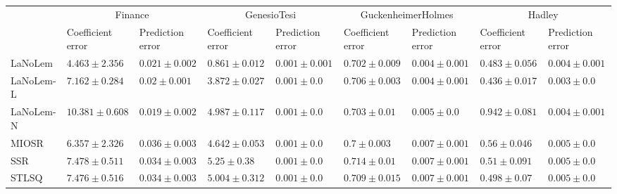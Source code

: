 \begin{table*}
{\begin{tabular}{lllllllll}
 & \multicolumn{2}{c}{Finance} & \multicolumn{2}{c}{GenesioTesi} & \multicolumn{2}{c}{GuckenheimerHolmes} & \multicolumn{2}{c}{Hadley} \\
 & Coefficient error & Prediction error & Coefficient error & Prediction error & Coefficient error & Prediction error & Coefficient error & Prediction error \\
\midrule
LaNoLem & $\mathbf{4.463}\pm 2.356$ & $0.021\pm 0.002$ & $\mathbf{0.861}\pm 0.012$ & $0.001\pm 0.001$ & $0.702\pm 0.009$ & $0.004\pm 0.001$ & $0.483\pm 0.056$ & $0.004\pm 0.001$ \\
LaNoLem-L & $7.162\pm 0.284$ & $0.02\pm 0.001$ & $3.872\pm 0.027$ & $0.001\pm 0.0$ & $0.706\pm 0.003$ & $\mathbf{0.004}\pm 0.001$ & $\mathbf{0.436}\pm 0.017$ & $\mathbf{0.003}\pm 0.0$ \\
LaNoLem-N & $10.381\pm 0.608$ & $\mathbf{0.019}\pm 0.002$ & $4.987\pm 0.117$ & $\mathbf{0.001}\pm 0.0$ & $0.703\pm 0.01$ & $0.005\pm 0.0$ & $0.942\pm 0.081$ & $0.004\pm 0.001$ \\
MIOSR & $6.357\pm 2.326$ & $0.036\pm 0.003$ & $4.642\pm 0.053$ & $0.001\pm 0.0$ & $\mathbf{0.7}\pm 0.003$ & $0.007\pm 0.001$ & $0.56\pm 0.046$ & $0.005\pm 0.0$ \\
SSR & $7.478\pm 0.511$ & $0.034\pm 0.003$ & $5.25\pm 0.38$ & $0.001\pm 0.0$ & $0.714\pm 0.01$ & $0.007\pm 0.001$ & $0.51\pm 0.091$ & $0.005\pm 0.0$ \\
STLSQ & $7.476\pm 0.516$ & $0.034\pm 0.003$ & $5.004\pm 0.312$ & $0.001\pm 0.0$ & $0.709\pm 0.015$ & $0.007\pm 0.001$ & $0.498\pm 0.07$ & $0.005\pm 0.0$ \\

\midrule


\end{tabular}}
\end{table*}
